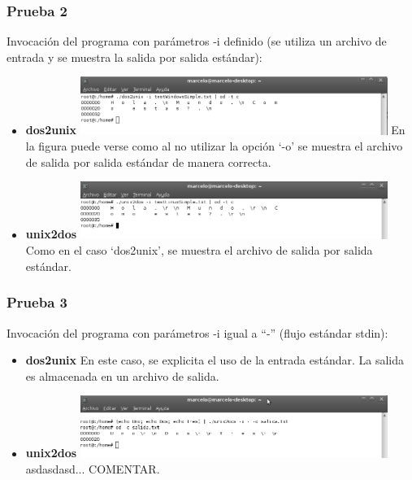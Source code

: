 \documentclass[a4paper,10pt]{article}
\begin{document}
    \subsubsection{Prueba 2}
    Invocaci\'on del programa con par\'ametros -i definido (se utiliza un archivo de entrada y se muestra
    la salida por salida est\'andar):
    \begin{itemize}
      \item \textbf{dos2unix}
      \newline
      \includegraphics[width=10cm, viewport=0 0 902 170]{../Informe/Imagenes/prueba2-invocacion-dos2unix.png}
      \newline	
      En la figura puede verse como al no utilizar la opci\'on `-o' se muestra el archivo de salida por
      salida est\'andar de manera correcta.	
      \item \textbf{unix2dos}
      \newline 
      \includegraphics[width=10cm, viewport=0 0 898 167]{../Informe/Imagenes/prueba2-invocacion-unix2dos.png}		
      \newline
      Como en el caso `dos2unix', se muestra el archivo de salida por salida est\'andar.
    \end{itemize}

    \subsubsection{Prueba 3}
    Invocaci\'on del programa con par\'ametros -i igual a ``-'' (flujo est\'andar stdin):
      \begin{itemize}
      \item \textbf{dos2unix}
      \newline 
      En este caso, se explicita el uso de la entrada est\'andar. La salida es almacenada en un archivo
      de salida. 
      \item \textbf{unix2dos}
      \newline 
      \includegraphics[width=10cm, viewport=0 0 897 181]{../Informe/Imagenes/prueba3-invocacion-unix2dos.png}	
      \newline
      asdasdasd... COMENTAR.
    \end{itemize}
\end{document}
